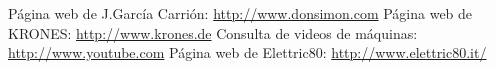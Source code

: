 \documentclass[11pt,a4paper,spanish,twoside]{report}
\begin{document}
\begin{thebibliography}{99}
 Página web de J.García Carrión: \url{http://www.donsimon.com}
 Página web de KRONES: \url{http://www.krones.de}
 Consulta de videos de máquinas:
  \url{http://www.youtube.com}
 Página web de Elettric80:  \url{http://www.elettric80.it/}
\end{thebibliography}
\end{document}
